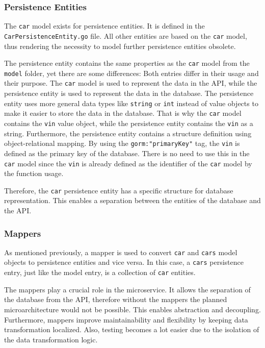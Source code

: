 \subsubsection*{Persistence Entities}
The \texttt{car} model exists for persistence entities.
It is defined in the \texttt{CarPersistenceEntity.go} file.
All other entities are based on the \texttt{car} model, thus rendering the necessity to model further persistence entities obsolete.

The persistence entity contains the same properties as the \texttt{car} model from the \texttt{model} folder, yet there are some differences:
Both entries differ in their usage and their purpose.
The \texttt{car} model is used to represent the data in the API, while the persistence entity is used to represent the data in the database.
The persistence entity uses more general data types like \texttt{string} or \texttt{int} instead of value objects to make it easier to store the data in the database.
That is why the \texttt{car} model contains the \texttt{vin} value object, while the persistence entity contains the \texttt{vin} as a string.
Furthermore, the persistence entity contains a structure definition using object-relational mapping.
By using the \texttt{gorm:"primaryKey"} tag, the \texttt{vin} is defined as the primary key of the database.
There is no need to use this in the \texttt{car} model since the \texttt{vin} is already defined as the identifier of the \texttt{car} model by the function usage.

Therefore, the \texttt{car} persistence entity has a specific structure for database representation.
This enables a separation between the entities of the database and the API.

\subsubsection*{Mappers}
As mentioned previously, a mapper is used to convert \texttt{car} and \texttt{cars} model objects to persistence entities and vice versa.
In this case, a \texttt{cars} persistence entry, just like the model entry, is a collection of \texttt{car} entities.

The mappers play a crucial role in the microservice.
It allows the separation of the database from the API, therefore without the mappers the planned microarchitecture would not be possible.
This enables abstraction and decoupling.
Furthermore, mappers improve maintainability and flexibility by keeping data transformation localized.
Also, testing becomes a lot easier due to the isolation of the data transformation logic.

